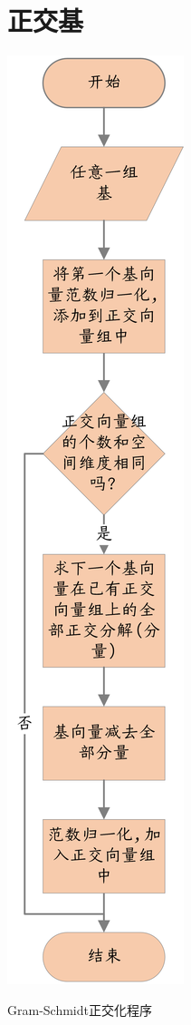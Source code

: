 \documentclass{tufte-book}
\begin{document}
\section{正交基}
\begin{marginfigure}
    \centering
    \includegraphics{Gram-Schmidt-procedure.png}
    \caption{Gram-Schmidt正交化程序}
\end{marginfigure}
\end{document}

